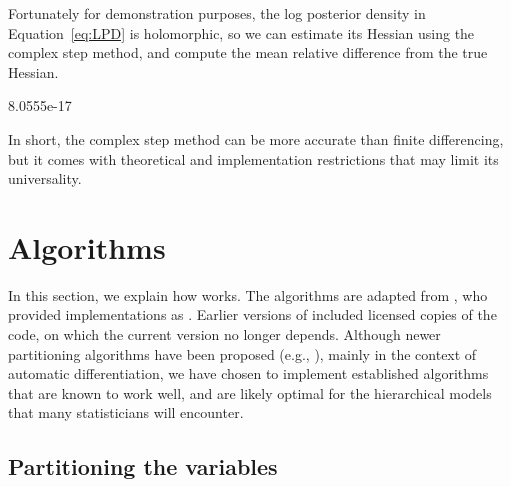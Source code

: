 \documentclass[jss]{jss}\usepackage[]{graphicx}\usepackage[]{color}
\begin{document}
Fortunately for demonstration purposes, the log posterior density in
Equation~\ref{eq:LPD} is holomorphic, so we
can estimate its Hessian using the complex step method, and compute
the mean relative difference from the true Hessian.

\begin{Schunk}
\begin{Soutput}
[1] 8.0555e-17
\end{Soutput}
\end{Schunk}



In short, the complex step method can be more accurate than
finite differencing, but it comes with theoretical and implementation
restrictions that may limit its universality.

\section[Algorithms]{Algorithms}\label{sec:algorithms}

In this section, we explain how  works. The
algorithms are adapted from \citet{ColemanGarbow1985}, who provided
 implementations as \citet{ColemanGarbow1985b}.  Earlier
versions of  included licensed copies of the
\citet{ColemanGarbow1985b} code, on which the current version no
longer depends. Although newer partitioning algorithms have been proposed (e.g.,
\citealp{GebremedhinManne2005,GebremedhinTarafdar2009}), mainly in the
context of automatic differentiation, we have chosen to implement
established algorithms that are known to work well, and are likely
optimal for the hierarchical models that many statisticians will encounter.


\subsection[Partitioning the variables]{Partitioning the variables}\label{sec:coloring}
\end{document}

